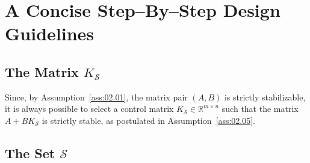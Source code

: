 \documentclass[twocolumn]{autart}
\newcommand{\mb}[1]{\mathbb{#1}}
\newcommand{\mc}[1]{\mathcal{#1}}
\newcommand{\R}{\mb{R}}
\newcommand{\Rnm}[2]{\R^{{#1}\times{#2}}}
\numberwithin{equation}{section}
\begin{document}
\section{A Concise Step--By--Step Design Guidelines}
\label{sec:05}

\subsection{The Matrix $K_\mc{S}$}
\label{sec:05.01}

Since, by Assumption~\ref{ass:02.01}, the matrix pair $(A,B)$ is strictly stabilizable, it is always possible to select a control matrix $K_\mc{S}\in\Rnm{m}{n}$ such that the matrix $A+BK_\mc{S}$ is strictly stable, as postulated in Assumption~\ref{ass:02.05}. 

\subsection{The Set $\mc{S}$}
\label{sec:05.02}
\end{document}
